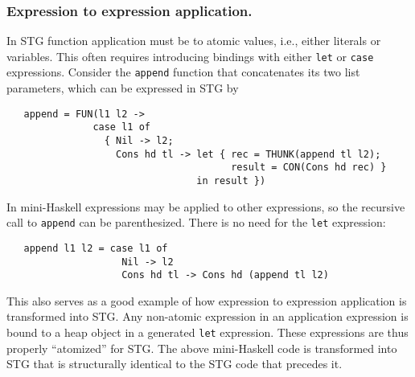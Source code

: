 \documentclass{llncs}
\begin{document}
\subsubsection{Expression to expression application.}
In STG function application must be to atomic values, i.e., either literals or
variables.  This often requires introducing bindings with either \texttt{let} or
\texttt{case} expressions.  Consider the \texttt{append} function that
concatenates its two list parameters, which can be expressed in STG by
{\footnotesize
\begin{verbatim}
   append = FUN(l1 l2 ->
               case l1 of
                 { Nil -> l2;
                   Cons hd tl -> let { rec = THUNK(append tl l2);
                                       result = CON(Cons hd rec) }
                                 in result })
\end{verbatim}}
\noindent In mini-Haskell expressions may be applied to other expressions, so the
recursive call to \texttt{append} can be parenthesized. There is no need for the
\texttt{let} expression:
{\footnotesize
\begin{verbatim}
   append l1 l2 = case l1 of
                    Nil -> l2
                    Cons hd tl -> Cons hd (append tl l2)
\end{verbatim}}
\noindent This also serves as a good example of how expression to expression application is
transformed into STG.  Any non-atomic expression in an application expression is
bound to a heap object in a generated \texttt{let} expression.  These
expressions are thus properly ``atomized'' for STG.  The above mini-Haskell code
is transformed into STG that is structurally identical to the STG code that
precedes it.

\vspace{-0.1in}
\end{document}
